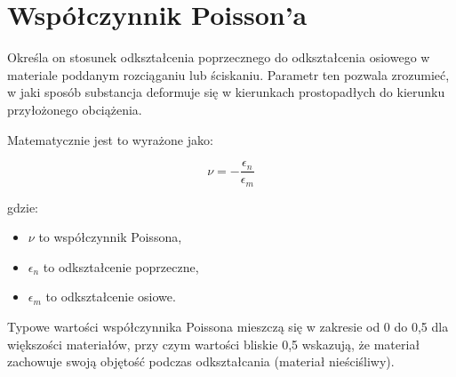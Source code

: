 {}
\justify
\fontsize{14}{16}\selectfont
\setlength{\parindent}{0pt}
\section*{Współczynnik Poisson'a \cite{alma991001031769708832}} 
\label{chap:wstep}
\fontsize{12}{14}\selectfont

\hspace{1.5cm} Określa on stosunek odkształcenia poprzecznego do odkształcenia osiowego w materiale poddanym rozciąganiu lub ściskaniu. Parametr ten pozwala zrozumieć, w jaki sposób substancja deformuje się w kierunkach prostopadłych do kierunku przyłożonego obciążenia.

Matematycznie jest to wyrażone jako:

$$
\nu = -\frac{\epsilon_n}{\epsilon_m}
$$

gdzie:
\begin{itemize}
    \item $\nu$ to współczynnik Poissona,
    \item $\epsilon_n$ to odkształcenie poprzeczne,
    \item $\epsilon_m$ to odkształcenie osiowe.
\end{itemize}

Typowe wartości współczynnika Poissona mieszczą się w zakresie od 0 do 0,5 dla większości materiałów, przy czym wartości bliskie 0,5 wskazują, że materiał zachowuje swoją objętość podczas odkształcania (materiał nieściśliwy).